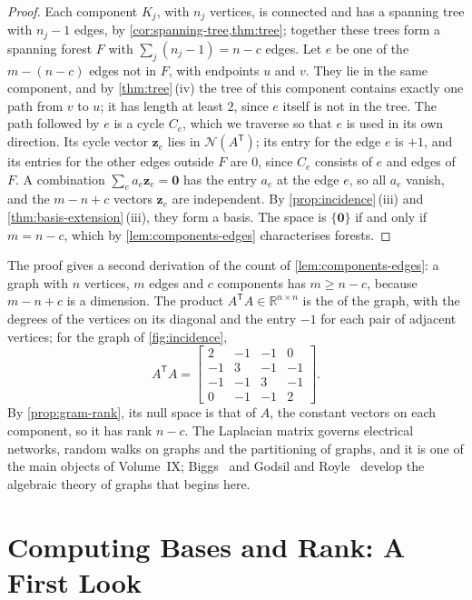 \begin{proof}
Each component $K_j$, with $n_j$ vertices, is connected and has a spanning tree with $n_j-1$ edges, by \cref{cor:spanning-tree,thm:tree}; together these trees form a spanning forest $F$ with $\sum_j(n_j-1)=n-c$ edges. Let $e$ be one of the $m-(n-c)$ edges not in $F$, with endpoints $u$ and $v$. They lie in the same component, and by \cref{thm:tree}\,(iv) the tree of this component contains exactly one path from $v$ to $u$; it has length at least $2$, since $e$ itself is not in the tree. The path followed by $e$ is a cycle $C_e$, which we traverse so that $e$ is used in its own direction. Its cycle vector $\mathbf z_e$ lies in $\mathcal N(A^{\mathsf T})$; its entry for the edge $e$ is $+1$, and its entries for the other edges outside $F$ are $0$, since $C_e$ consists of $e$ and edges of $F$. A combination $\sum_ea_e\mathbf z_e=\mathbf 0$ has the entry $a_e$ at the edge $e$, so all $a_e$ vanish, and the $m-n+c$ vectors $\mathbf z_e$ are independent. By \cref{prop:incidence}\,(iii) and \cref{thm:basis-extension}\,(iii), they form a basis. The space is $\{\mathbf 0\}$ if and only if $m=n-c$, which by \cref{lem:components-edges} characterises forests.
\end{proof}

The proof gives a second derivation of the count of \cref{lem:components-edges}: a graph with $n$ vertices, $m$ edges and $c$ components has $m\ge n-c$, because $m-n+c$ is a dimension. The product $A^{\mathsf T}A\in\mathbb R^{n\times n}$ is the  of the graph, with the degrees of the vertices on its diagonal and the entry $-1$ for each pair of adjacent vertices; for the graph of \cref{fig:incidence},
\[
A^{\mathsf T}A=\begin{bmatrix}2&-1&-1&0\\-1&3&-1&-1\\-1&-1&3&-1\\0&-1&-1&2\end{bmatrix}.
\]
By \cref{prop:gram-rank}, its null space is that of $A$, the constant vectors on each component, so it has rank $n-c$. The Laplacian matrix governs electrical networks, random walks on graphs and the partitioning of graphs, and it is one of the main objects of Volume~IX; Biggs~\cite{biggs1993} and Godsil and Royle~\cite{godsil2001} develop the algebraic theory of graphs that begins here.

\section{Computing Bases and Rank: A First Look}
\label{sec:computing-rank}

